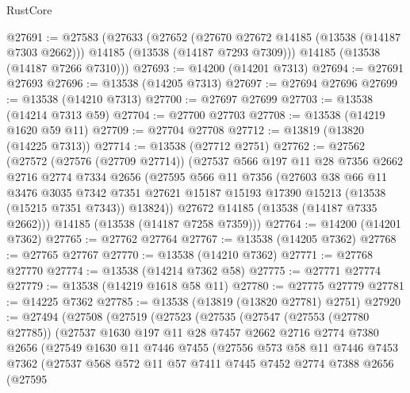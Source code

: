 \begin{lexlean}{RustCore}
\begin{coremodule}
@27691 := @27583
    (@27633
      (@27652
        (@27670 @27672 @14185 (@13538 (@14187 @7303 @2662)))
        @14185
        (@13538 (@14187 @7293 @7309)))
      @14185
      (@13538 (@14187 @7266 @7310)))
@27693 := @14200 (@14201 @7313)
@27694 := @27691 @27693
@27696 := @13538 (@14205 @7313)
@27697 := @27694 @27696
@27699 := @13538 (@14210 @7313)
@27700 := @27697 @27699
@27703 := @13538 (@14214 @7313 @59)
@27704 := @27700 @27703
@27708 := @13538 (@14219 @1620 @59 @11)
@27709 := @27704 @27708
@27712 := @13819 (@13820 (@14225 @7313))
@27714 := @13538 (@27712 @2751)
@27762 := @27562
    (@27572
      (@27576 (@27709 @27714))
      (@27537
        @566
        @197
        @11
        @28
        @7356
        @2662
        @2716
        @2774
        @7334
        @2656
        (@27595
          @566
          @11
          @7356
          (@27603
            @38
            @66
            @11
            @3476
            @3035
            @7342
            @7351
            @27621
            @15187
            @15193
            @17390
            @15213
            (@13538 (@15215 @7351 @7343))
            @13824))
        @27672
        @14185
        (@13538 (@14187 @7335 @2662)))
      @14185
      (@13538 (@14187 @7258 @7359)))
@27764 := @14200 (@14201 @7362)
@27765 := @27762 @27764
@27767 := @13538 (@14205 @7362)
@27768 := @27765 @27767
@27770 := @13538 (@14210 @7362)
@27771 := @27768 @27770
@27774 := @13538 (@14214 @7362 @58)
@27775 := @27771 @27774
@27779 := @13538 (@14219 @1618 @58 @11)
@27780 := @27775 @27779
@27781 := @14225 @7362
@27785 := @13538 (@13819 (@13820 @27781) @2751)
@27920 := @27494
    (@27508
      (@27519
        (@27523
          (@27535
            (@27547
              (@27553 (@27780 @27785))
              (@27537
                @1630
                @197
                @11
                @28
                @7457
                @2662
                @2716
                @2774
                @7380
                @2656
                (@27549
                  @1630
                  @11
                  @7446
                  @7455
                  (@27556
                    @573
                    @58
                    @11
                    @7446
                    @7453
                    @7362
                    (@27537
                      @568
                      @572
                      @11
                      @57
                      @7411
                      @7445
                      @7452
                      @2774
                      @7388
                      @2656
                      (@27595

\end{coremodule}
\end{lexlean}
